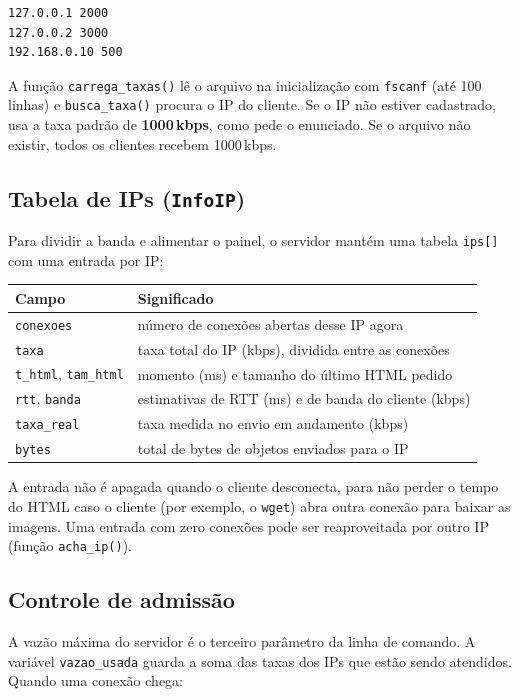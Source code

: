 \documentclass[11pt,a4paper]{article}
\begin{document}
\begin{lstlisting}
127.0.0.1 2000
127.0.0.2 3000
192.168.0.10 500
\end{lstlisting}

A função \texttt{carrega\_taxas()} lê o arquivo na inicialização com \texttt{fscanf}
(até 100 linhas) e \texttt{busca\_taxa()} procura o IP do cliente. Se o IP não estiver
cadastrado, usa a taxa padrão de \textbf{1000\,kbps}, como pede o enunciado. Se o arquivo
não existir, todos os clientes recebem 1000\,kbps.

\subsection{Tabela de IPs (\texttt{InfoIP})}
Para dividir a banda e alimentar o painel, o servidor mantém uma tabela \texttt{ips[]}
com uma entrada por IP:

\begin{table}[h]
\centering
\begin{tabularx}{\linewidth}{@{}lX@{}}
\toprule
\textbf{Campo} & \textbf{Significado} \\
\midrule
\texttt{conexoes} & número de conexões abertas desse IP agora \\
\texttt{taxa} & taxa total do IP (kbps), dividida entre as conexões \\
\texttt{t\_html}, \texttt{tam\_html} & momento (ms) e tamanho do último HTML pedido \\
\texttt{rtt}, \texttt{banda} & estimativas de RTT (ms) e de banda do cliente (kbps) \\
\texttt{taxa\_real} & taxa medida no envio em andamento (kbps) \\
\texttt{bytes} & total de bytes de objetos enviados para o IP \\
\bottomrule
\end{tabularx}
\end{table}

A entrada não é apagada quando o cliente desconecta, para não perder o tempo do HTML caso o
cliente (por exemplo, o \texttt{wget}) abra outra conexão para baixar as imagens. Uma
entrada com zero conexões pode ser reaproveitada por outro IP (função \texttt{acha\_ip()}).

\subsection{Controle de admissão}
A vazão máxima do servidor é o terceiro parâmetro da linha de comando. A variável
\texttt{vazao\_usada} guarda a soma das taxas dos IPs que estão sendo atendidos. Quando uma
conexão chega:
\end{document}
